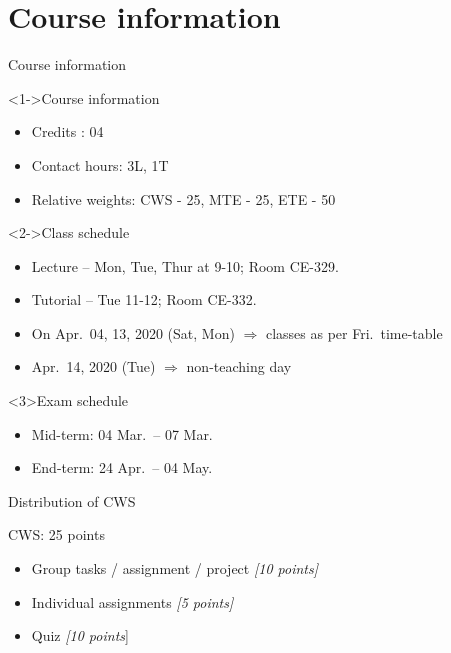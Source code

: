 \section{Course information}
\begin{frame}[t]{Course information}
\begin{block}<1->{Course information}
\begin{itemize}[$\bullet$]
\item Credits : 04
\item Contact hours: 3L, 1T
\item Relative weights: CWS - 25, MTE - 25, ETE - 50
\end{itemize}
\end{block}
%
\begin{exampleblock}<2->{Class schedule}
	\begin{itemize}[$\bullet$]
		\item Lecture -- Mon, Tue, Thur at 9-10; Room CE-329.
		\item Tutorial -- Tue 11-12; Room CE-332.
		\item On Apr.\ 04, 13, 2020 (Sat, Mon) $\Rightarrow$ classes as per Fri.\ time-table
		\item Apr.\ 14, 2020 (Tue) $\Rightarrow$ non-teaching day
	\end{itemize}
\end{exampleblock}
%
\begin{alertblock}<3>{Exam schedule}
	\begin{itemize}[$\bullet$]
		\item Mid-term: 04 Mar.\ -- 07 Mar.
		\item End-term: 24 Apr.\ -- 04 May.
	\end{itemize}
\end{alertblock}
\end{frame}

\begin{frame}[t]{Distribution of CWS}
%
\begin{exampleblock}{CWS: 25 points}
	\begin{itemize}[$\bullet$]
		\item Group tasks / assignment / project \textit{[10 points]}
		\item Individual assignments \textit{[5 points]}
		\item Quiz \textit{[10 points}]
	\end{itemize}
\end{exampleblock}
\end{frame}

